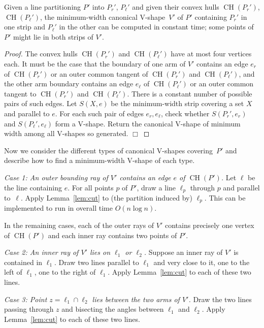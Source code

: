 \documentclass{llncs}
\DeclareMathOperator{\conv}{CH}
\begin{document}
\begin{lemma}
  \label{lem:cut}
  Given a line partitioning $P'$ into $P_r'$, $P_\ell'$ and given
  their convex hulls $\conv(P_r')$, $\conv(P_\ell')$, the minimum-width
  canonical V-shape~$V'$ of $P'$ containing $P_r'$ in one strip and $P_\ell'$ in
  the other can be computed in constant time; some points
  of $P'$ might lie in both strips of $V'$.
\end{lemma}

\begin{proof}
  The convex hulls $\conv(P_r')$ and $\conv(P_\ell')$ have at most four
  vertices each. It must be the case that the
  boundary of one arm of $V'$ contains an edge $e_r$ of $\conv(P_r')$ or
  an outer common tangent of $\conv(P_r')$ and $\conv(P_\ell')$, and the
  other arm boundary contains an edge $e_\ell$ of $\conv(P_\ell')$ or an
  outer common tangent to $\conv(P_r')$ and $\conv(P_\ell')$.  There is
  a constant number of possible pairs of such edges.  Let $S(X,e)$ be
  the minimum-width strip covering a set $X$ and parallel to $e$.  For
  each such pair of edges $e_r,e_\ell$, check whether $S(P_r',e_r)$
  and $S(P_\ell',e_\ell)$ form a V-shape.  Return the canonical V-shape of
  minimum width among all V-shapes so generated. \hfill $\Box$
\end{proof}

Now we consider the different types of canonical V-shapes
covering~$P'$ and describe how to find a minimum-width V-shape of each
type.

\emph{Case 1: An outer bounding ray of $V'$ contains an edge $e$ of $\conv(P')$.}
Let $\ell$ be the line containing $e$.  For all points $p$ of $P'$,
draw a line $\ell_p$ through $p$ and parallel to~$\ell$.  Apply
Lemma~\ref{lem:cut} to (the partition induced by) $\ell_p$.  This can be
implemented to run in overall time $O(n\log n)$.

\smallskip

In the remaining cases, each of the outer rays of $V'$ contains
precisely one vertex of $\conv(P')$ and each inner ray contains two
points of $P'$.

\emph{Case 2: An inner ray of $V'$ lies on $\ell_1$ or $\ell_2$.}
Suppose an inner ray of $V'$ is contained in $\ell_1$.
Draw two lines parallel to $\ell_1$ and very close to it,
one to the left of $\ell_1$, one to the right of $\ell_1$.
Apply Lemma~\ref{lem:cut} to each of these two lines.

\emph{Case 3: Point $z=\ell_1\cap\ell_2$ lies between the two arms of $V'$.}
Draw the two lines passing through $z$ and bisecting the angles
between $\ell_1$ and $\ell_2$.  
Apply Lemma~\ref{lem:cut} to each of these two
lines.
\end{document}
